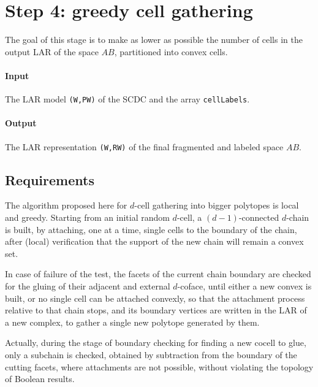 \documentclass[11pt,oneside]{article}	%
\begin{document}
\section{Step 4: greedy cell gathering}

The goal of this stage is to make as lower as possible the number of cells in the  output LAR of the space $AB$, partitioned into convex cells.

\paragraph{Input}
The LAR model \texttt{(W,PW)} of the SCDC and the array \texttt{cellLabels}.

\paragraph{Output}
The LAR representation \texttt{(W,RW)} of the final fragmented and labeled space $AB$.


\subsection{Requirements}

The algorithm proposed here for $d$-cell gathering into bigger polytopes is local and greedy. Starting from an initial random $d$-cell, a $(d-1)$-connected $d$-chain is built, by attaching, one at a time, single cells to the boundary of the chain, after (local) verification that the support of the new chain will remain a convex set. 

In case of failure of the test, the facets of the current chain boundary are checked for the gluing of their adjacent and external $d$-coface, until either a new convex is built, or no single cell can be attached convexly, so that the attachment process relative to that chain stops, and its boundary vertices are written in the LAR of a new complex, to gather a single new polytope generated by them. 

Actually, during the stage of boundary checking for finding a new cocell to glue, only a subchain is checked, obtained by subtraction from the boundary of the cutting facets, where attachments are not possible, without
violating the topology of Boolean results. 
\end{document}
